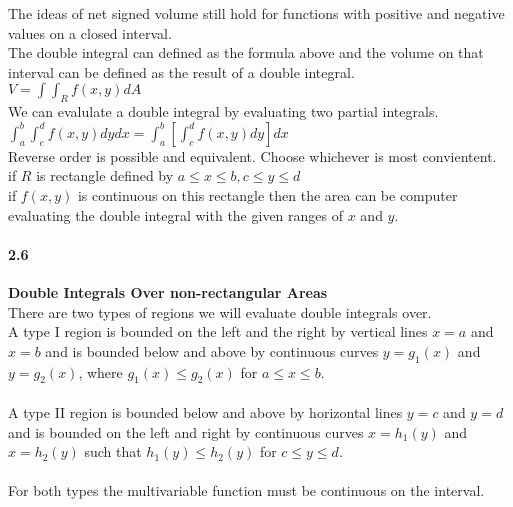 \documentclass[14pt]{extreport}
\begin{document}
The ideas of net signed volume still hold for functions with positive and negative values on a closed interval.\\


The double integral can defined as the formula above and the volume on that interval can be defined as the result of a double integral.\\

$V = \int\int_R f(x,y) dA$\\

We can evalulate a double integral by evaluating two partial integrals.\\

$\int_a^b\int_c^d f(x,y)dy dx = \int_a^b[\int_c^d f(x,y)dy] dx$\\

Reverse order is possible and equivalent. Choose whichever is most convientent.\\

if $R$ is rectangle defined by $a \le x \le b, c \le y \le d$\\

if $f(x,y)$ is continuous on this rectangle then the area can be computer evaluating the double integral with the given ranges of $x$ and $y$.\\

\paragraph{2.6} \textbf{Double Integrals Over non-rectangular Areas}\\

There are two types of regions we will evaluate double integrals over.\\

A type I region is bounded on the left and the right by vertical lines $x=a$ and $x=b$ and is bounded below and above by continuous curves $y=g_1(x)$ 
and $y=g_2(x)$, where $g_1(x) \le g_2(x)$ for $a \le x \le b$.\\\\

A type II region is bounded below and above by horizontal lines $y=c$ and $y=d$ and is bounded on the left
and right by continuous curves $x=h_1(y)$ and $x=h_2(y)$ such that $h_1(y) \le h_2(y)$ for $c \le y \le d$.\\\\


For both types the multivariable function must be continuous on the interval.\\
\end{document}
